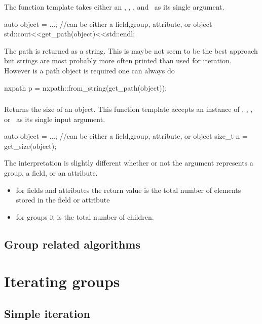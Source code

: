 The  function template takes either an \nxobject, \nxattribute,
\nxfield, and \nxgroup\ as its single argument.
\begin{cppcode}
auto object = ...; //can be either a field,group, attribute, or object
std::cout<<get_path(object)<<std::endl;
\end{cppcode}
The path is returned as a string. This is maybe not seem to be the best approach
but strings are most probably more often printed than used for iteration. 
However is a path object is required one can always do
\begin{cppcode}
nxpath p = nxpath::from_string(get_path(object));
\end{cppcode}

\subsubsection{}

Returns the size of an object. This function template accepts an instance of 
\nxobject, \nxattribute, \nxfield, or \nxgroup\ as its single input argument.
\begin{cppcode}
auto object = ...; //can be either a field,group, attribute, or object
size_t n = get_size(object);
\end{cppcode}
The interpretation is slightly different whether or not the argument 
represents a group, a field, or an attribute. 
\begin{itemize}
\item for fields and attributes the return value is the total number of 
elements stored in the field or attribute 
\item for groups it is the total number of children.
\end{itemize}

\subsection{Group related algorithms}


\section{Iterating groups}\label{section:group_iteration}

\subsection{Simple iteration}

